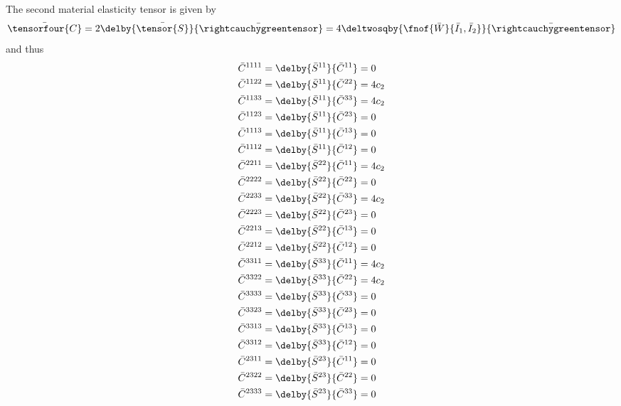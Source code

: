 The second material elasticity tensor is given by
\begin{equation}
  \bar{\tensorfour{C}}=2\delby{\bar{\tensor{S}}}{\bar{\rightcauchygreentensor}}=4\deltwosqby{\fnof{\bar{W}}{\bar{I}_{1},\bar{I}_{2}}}{\bar{\rightcauchygreentensor}}\\
\end{equation}
and thus
\begin{equation}
  \begin{split}
    \bar{C}^{1111}&=\delby{\bar{S}^{11}}{\bar{C}^{11}}=0\\
    \bar{C}^{1122}&=\delby{\bar{S}^{11}}{\bar{C}^{22}}=4c_{2}\\
    \bar{C}^{1133}&=\delby{\bar{S}^{11}}{\bar{C}^{33}}=4c_{2}\\
    \bar{C}^{1123}&=\delby{\bar{S}^{11}}{\bar{C}^{23}}=0\\
    \bar{C}^{1113}&=\delby{\bar{S}^{11}}{\bar{C}^{13}}=0\\
    \bar{C}^{1112}&=\delby{\bar{S}^{11}}{\bar{C}^{12}}=0\\
    \bar{C}^{2211}&=\delby{\bar{S}^{22}}{\bar{C}^{11}}=4c_{2}\\
    \bar{C}^{2222}&=\delby{\bar{S}^{22}}{\bar{C}^{22}}=0\\
    \bar{C}^{2233}&=\delby{\bar{S}^{22}}{\bar{C}^{33}}=4c_{2}\\
    \bar{C}^{2223}&=\delby{\bar{S}^{22}}{\bar{C}^{23}}=0\\
    \bar{C}^{2213}&=\delby{\bar{S}^{22}}{\bar{C}^{13}}=0\\
    \bar{C}^{2212}&=\delby{\bar{S}^{22}}{\bar{C}^{12}}=0\\
    \bar{C}^{3311}&=\delby{\bar{S}^{33}}{\bar{C}^{11}}=4c_{2}\\
    \bar{C}^{3322}&=\delby{\bar{S}^{33}}{\bar{C}^{22}}=4c_{2}\\
    \bar{C}^{3333}&=\delby{\bar{S}^{33}}{\bar{C}^{33}}=0\\
    \bar{C}^{3323}&=\delby{\bar{S}^{33}}{\bar{C}^{23}}=0\\
    \bar{C}^{3313}&=\delby{\bar{S}^{33}}{\bar{C}^{13}}=0\\
    \bar{C}^{3312}&=\delby{\bar{S}^{33}}{\bar{C}^{12}}=0\\
    \bar{C}^{2311}&=\delby{\bar{S}^{23}}{\bar{C}^{11}}=0\\
    \bar{C}^{2322}&=\delby{\bar{S}^{23}}{\bar{C}^{22}}=0\\
    \bar{C}^{2333}&=\delby{\bar{S}^{23}}{\bar{C}^{33}}=0\\

\end{split}
\end{equation}

